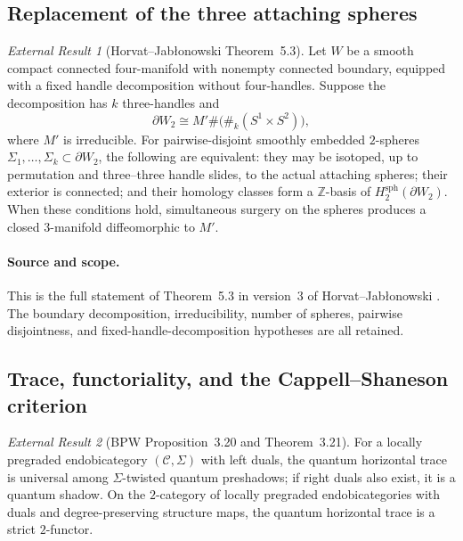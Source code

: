 \documentclass[10pt,reqno]{amsart}
\theoremstyle{definition}
\theoremstyle{remark}
\newtheorem{externalresult}{External Result}
\newcommand{\Z}{\mathbb Z}
\begin{document}
\subsection{Replacement of the three attaching spheres}

\begin{externalresult}[Horvat--Jab\l onowski Theorem~5.3]\label{prop:hj-theorem53}
Let $W$ be a smooth compact connected four-manifold with nonempty connected
boundary, equipped with a fixed handle decomposition without four-handles.
Suppose the decomposition has $k$ three-handles and
\[
 \partial W_2\cong M'\#\bigl(\#_k(S^1\times S^2)\bigr),
\]
where $M'$ is irreducible.  For pairwise-disjoint smoothly embedded
$2$-spheres $\Sigma_1,\ldots,\Sigma_k\subset\partial W_2$, the following are
equivalent: they may be isotoped, up to permutation and three--three handle
slides, to the actual attaching spheres; their exterior is connected; and
their homology classes form a $\Z$-basis of
$H_2^{\mathrm{sph}}(\partial W_2)$.  When these conditions hold, simultaneous
surgery on the spheres produces a closed $3$-manifold diffeomorphic to $M'$.
\end{externalresult}

\paragraph{Source and scope.}
This is the full statement of Theorem~5.3 in version~3 of
Horvat--Jab\l onowski \cite[Theorem~5.3]{HorvatJablonowski2026}.  The boundary
decomposition, irreducibility, number of spheres, pairwise disjointness, and
fixed-handle-decomposition hypotheses are all retained.

\subsection{Trace, functoriality, and the Cappell--Shaneson criterion}

\begin{externalresult}[BPW Proposition~3.20 and Theorem~3.21]\label{prop:bpw-trace}
For a locally pregraded endobicategory $(\mathcal C,\Sigma)$ with left duals,
the quantum horizontal trace is universal among $\Sigma$-twisted quantum
preshadows; if right duals also exist, it is a quantum shadow.  On the
$2$-category of locally pregraded endobicategories with duals and
degree-preserving structure maps, the quantum horizontal trace is a strict
$2$-functor.
\end{externalresult}
\end{document}
